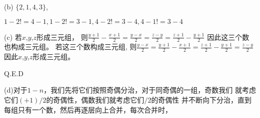 \documentclass[UTF8]{ctexart}
\renewcommand{\(}{\left(}
\renewcommand{\)}{\right)}
\begin{document}
(b) $\{2,1,4,3\}$,

$1-2!=4-1,1-2!=3-1,4-2!=3-4,4-1!=3-4$

(c) 若$x$,$y$,$z$形成三元组，
则$\frac{y+1}{2}-\frac{x+1}{2}=\frac{y-x}{2}=\frac{z-y}{2}=\frac{z+1}{2}-\frac{y+1}{2}$
因此这三个数也构成三元组。
若这三个数构成三元组,
则$\frac{y-x}{2}=\frac{y+1}{2}-\frac{x+1}{2}=\frac{z+1}{2}-\frac{y+1}{2}=\frac{z-y}{2}$
因此$x$,$y$,$z$形成三元组。

Q.E.D

(d)对于$1-n$，我们先将它们按照奇偶分治，对于同奇偶的一组，奇数我们 就考虑它们$(+1)/2$的奇偶性，偶数我们就考虑它们$/2$的奇偶性
并不断向下分治，直到每组只有一个数，然后再逐层向上合并，每次合并时，
\end{document}
